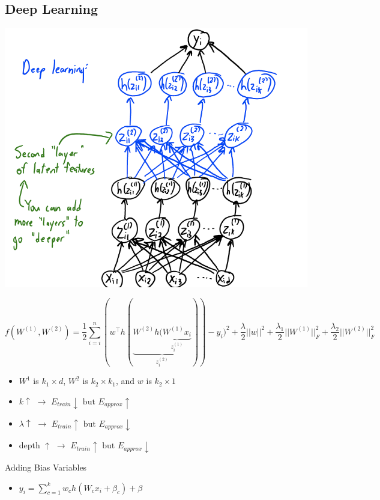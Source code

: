 \documentclass[10pt,landscape,a4paper]{article}
\begin{document}
\begin{multicols*}{5}
\subsection{Deep Learning}
\begin{center}
    \includegraphics[scale=0.15]{2_hidden_layer_deep_learning}
\end{center}
\begin{dmath*}
    f(W^{(1)},W^{(2)}) = \frac{1}{2} \sum_{i=i}^{n} (w^\intercal h (\underbrace{W^{(2)}h(\underbrace{W^{(1)}x_i}_{z_i^{(1)}}}_{z_i^{(2)}}))-y_i)^2 + \frac{\lambda}{2}||w||^2 + \frac{\lambda_1}{2} ||W^{(1)}||_F^2 + \frac{\lambda_2}{2} ||W^{(2)}||_F^2
\end{dmath*}
\begin{itemize}
    \item \(W^1\) is \(k_1 \times d\), \(W^2\) is \(k_2 \times k_1\), and \(w\) is \(k_2 \times 1\)
    \item \(k \uparrow \) \(\rightarrow \) \(E_{train} \downarrow \text{ but } E_{approx} \uparrow \)
    \item \(\lambda \uparrow \) \(\rightarrow \) \(E_{train} \uparrow \text{ but } E_{approx} \downarrow \)
    \item depth \(\uparrow \) \(\rightarrow \) \(E_{train} \uparrow \text{ but } E_{approx} \downarrow \)
\end{itemize}
Adding Bias Variables
\begin{itemize}
    \item \(y_i = \sum\limits_{c=1}^{k} w_c h(W_c x_i + \beta_c) + \beta\)

\end{itemize}
\end{multicols*}
\end{document}
